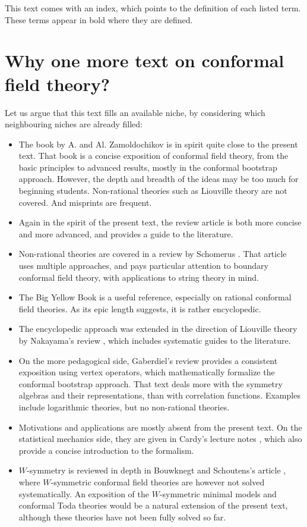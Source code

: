 \documentclass[12pt, a4paper, notitlepage, twoside]{report}
\numberwithin{equation}{section}
\theoremstyle{break}
\begin{document}
This text comes with an index, which points to the definition of each listed term. 
These terms appear in bold where they are defined.


\section{Why one more text on conformal field theory?}\label{sec:womt}

Let us argue that this text fills an available niche, by considering which neighbouring niches are already filled: 
\begin{itemize}
\item 
The book \cite{zz90} by A. and Al. Zamoldochikov is in spirit quite close to the present text.
That book is a concise exposition of conformal field theory, from the basic principles to advanced results, mostly in the conformal bootstrap approach.
However, the depth and breadth of the ideas may be too much for beginning students.
Non-rational theories such as Liouville theory are not covered.
And misprints are frequent.
\item
Again in the spirit of the present text, the review article \cite{tes17} is both more concise and more advanced, and provides a guide to the literature.
\item
Non-rational theories are covered in a review by Schomerus \cite{sch05}.
That article uses multiple approaches, and pays particular attention to boundary conformal field theory, with applications to string theory in mind. 
\item
The Big Yellow Book \cite{fms97} is a useful reference, especially on rational conformal field theories.
As its epic length suggests, it is rather encyclopedic. 
\item
The encyclopedic approach was extended in the direction of Liouville theory by Nakayama's review \cite{nak04}, which includes systematic guides to the literature.
\item 
On the more pedagogical side, Gaberdiel's review \cite{gab99} provides a consistent exposition using vertex operators, which mathematically formalize the conformal bootstrap approach.
That text deals more with the symmetry algebras and their representations, than with correlation functions.
Examples include logarithmic theories, but no non-rational theories.
\item
Motivations and applications are mostly absent from the present text.
On the statistical mechanics side, they are given in Cardy's lecture notes \cite{car08}, which also provide a concise introduction to the formalism.
\item 
$W$-symmetry is reviewed in depth in Bouwknegt and Schoutens's article \cite{bs92}, where $W$-symmetric conformal field theories are however not solved systematically.
An exposition of the $W$-symmetric minimal models and conformal Toda theories would be a natural extension of the present text, although these theories have not been fully solved so far. 
\end{itemize}
\end{document}
